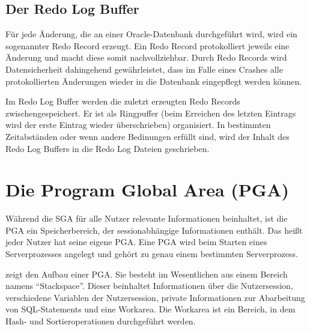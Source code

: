       \subsection{Der Redo Log Buffer}
        F\"ur jede \"Anderung, die an einer Oracle-Datenbank durchgef\"uhrt wird, wird ein sogenannter Redo Record erzeugt. Ein Redo Record protokolliert jeweils eine \"Anderung und macht diese somit nachvollziehbar. Durch Redo Records wird Datensicherheit dahingehend gew\"ahrleistet, dass im Falle eines Crashes alle protokollierten \"Anderungen wieder in die Datenbank eingepflegt werden k\"onnen.


        Im Redo Log Buffer werden die zuletzt erzeugten Redo Records zwischengespeichert. Er ist als Ringpuffer (beim Erreichen des letzten Eintrags wird der erste Eintrag wieder \"uber\-schrie\-ben) organisiert. In bestimmten Zeitabst\"anden oder wenn andere Bedinungen erf\"ullt sind, wird der Inhalt des Redo Log Buffers in die Redo Log Dateien geschrieben.

    \section{Die Program Global Area (PGA)}
      W\"ahrend die SGA f\"ur alle Nutzer relevante Informationen beinhaltet, ist die PGA ein Speicherbereich, der sessionabh\"angige Informationen enth\"alt. Das hei\ss t jeder Nutzer hat seine eigene PGA. Eine PGA wird beim Starten eines Serverprozesses angelegt und geh\"ort zu genau einem bestimmten Serverprozess.


       zeigt den Aufbau einer PGA. Sie besteht im Wesentlichen aus einem Bereich namens \enquote{Stackspace}. Dieser beinhaltet Informationen \"uber die Nutzersession, verschiedene Variablen der Nutzersession, private Informationen zur Abarbeitung von SQL-Statements und eine Workarea. Die Workarea ist ein Bereich, in dem Hash- und Sortieroperationen durchgef\"uhrt werden.

      \begin{literaturinternet}
        \item \cite{CNCPT1237}
      \end{literaturinternet}
